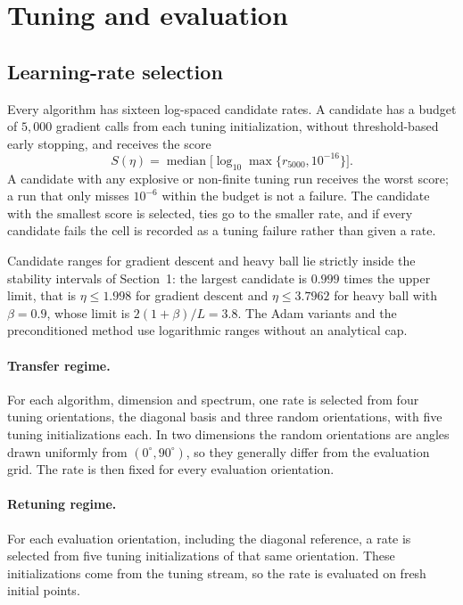 \documentclass[11pt,a4paper]{article}
\begin{document}
\section{Tuning and evaluation}\label{sec:tuning}

\subsection{Learning-rate selection}
Every algorithm has sixteen log-spaced candidate rates. A candidate has a
budget of $5{,}000$ gradient calls from each tuning initialization, without
threshold-based early stopping, and receives the score
\begin{equation}
  S(\eta)=\operatorname{median}\Big[\log_{10}\max\{r_{5000},10^{-16}\}\Big].
\end{equation}
A candidate with any explosive or non-finite tuning run receives the worst
score; a run that only misses $10^{-6}$ within the budget is not a failure.
The candidate with the smallest score is selected, ties go to the smaller rate,
and if every candidate fails the cell is recorded as a tuning failure rather
than given a rate.

Candidate ranges for gradient descent and heavy ball lie strictly inside the
stability intervals of Section~1: the largest candidate is $0.999$ times the
upper limit, that is $\eta\le1.998$ for gradient descent and $\eta\le3.7962$ for
heavy ball with $\beta=0.9$, whose limit is $2(1+\beta)/L=3.8$. The Adam
variants and the preconditioned method use logarithmic ranges without an
analytical cap.

\paragraph{Transfer regime.} For each algorithm, dimension and spectrum, one
rate is selected from four tuning orientations, the diagonal basis and three
random orientations, with five tuning initializations each. In two dimensions
the random orientations are angles drawn uniformly from $(0^\circ,90^\circ)$,
so they generally differ from the evaluation grid. The rate is then fixed for
every evaluation orientation.

\paragraph{Retuning regime.} For each evaluation orientation, including the
diagonal reference, a rate is selected from five tuning initializations of that
same orientation. These initializations come from the tuning stream, so the
rate is evaluated on fresh initial points.
\end{document}
